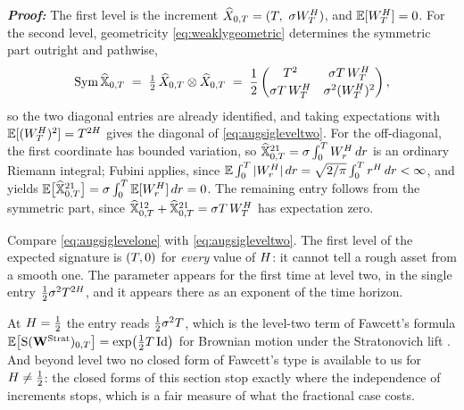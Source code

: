 \textbf{\textit{Proof:}} The first level is the increment
$\widehat X_{0,\Mat} = (\Mat,\ \sigma\BH_\Mat)$, and $\mathbb{E}[W^{H}_T]=0$. For the second level,
geometricity \eqref{eq:weaklygeometric} determines the symmetric part outright and pathwise,
\[
\operatorname{Sym}\widehat{\mathbb{X}}_{0,T} \;=\; \tfrac12\,\widehat X_{0,T}\otimes\widehat X_{0,T}
\;=\; \frac12\begin{pmatrix} T^2 & \sigma T\,W^{H}_T \\[2pt] \sigma T\,W^{H}_T & \sigma^2(W^{H}_T)^2 \end{pmatrix},
\]
so the two diagonal entries are already identified, and taking expectations with
$\mathbb{E}[(W^{H}_T)^2] = T^{2H}$ gives the diagonal of \eqref{eq:augsigleveltwo}. For the
off-diagonal, the first coordinate has bounded variation, so
$\widehat{\mathbb{X}}^{21}_{0,T} = \sigma\int_0^{T}W^{H}_r\,d r$ is an ordinary Riemann integral;
Fubini applies, since
$\mathbb{E}\int_0^{T}|W^{H}_r|\,d r = \sqrt{2/\pi}\int_0^{T} r^{H}\,d r < \infty$, and yields
$\mathbb{E}\bigl[\widehat{\mathbb{X}}^{21}_{0,T}\bigr] = \sigma\int_0^T \mathbb{E}[W^{H}_r]\,d r = 0$. The remaining
entry follows from the symmetric part, since
$\widehat{\mathbb{X}}^{12}_{0,T} + \widehat{\mathbb{X}}^{21}_{0,T} = \sigma T\,W^{H}_T$ has expectation
zero. \qedfilledtext


Compare \eqref{eq:augsiglevelone} with \eqref{eq:augsigleveltwo}. The first level of the expected
signature is $(T,0)$ for \emph{every} value of $H$: it cannot tell a rough asset from a
smooth one. The parameter appears for the first time at level two, in the single entry
$\tfrac12\sigma^2T^{2H}$, and it appears there as an exponent of the time horizon.



At $H=\tfrac12$ the entry reads $\tfrac12\sigma^2T$, which
is the level-two term of Fawcett's formula
$\mathbb{E}\bigl[\mathrm{S}(\mathbf{W}^{\mathrm{Strat}})_{0,T}\bigr] = \exp\bigl(\tfrac12T\,\mathrm{Id}\bigr)$
for Brownian motion under the Stratonovich lift \cite{frizvictoir2010}. And beyond level two no
closed form of Fawcett's type is available to us for $H\neq\tfrac12$: the closed forms of this section stop
exactly where the independence of increments stops, which is a fair measure of what the fractional
case costs.


